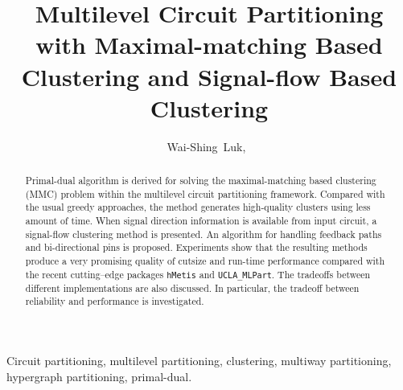 \documentclass[journal]{IEEEtran}
\begin{document}
\title{
  Multilevel Circuit Partitioning with Maximal-matching Based
  Clustering and Signal-flow Based Clustering
} 
\author{Wai-Shing~Luk,~}%
\maketitle

\begin{abstract}
Primal-dual algorithm is derived for solving
the maximal-matching based clustering (MMC) problem within the multilevel
circuit partitioning framework. Compared with the usual greedy approaches, the
method generates high-quality clusters using less amount of time. 
When signal direction information is available from input
circuit, a signal-flow clustering method is presented. An algorithm for
handling feedback paths and bi-directional pins is proposed.
Experiments show that the resulting methods produce a
very promising quality of cutsize and run-time performance compared
with the recent cutting--edge packages \verb+hMetis+ and \verb+UCLA_MLPart+. 
The tradeoffs between different implementations are also discussed.   
In particular, the tradeoff between reliability and performance is
investigated.
\end{abstract}

\begin{keywords}
Circuit partitioning, multilevel partitioning, clustering, 
multiway partitioning, hypergraph partitioning, primal-dual.
\end{keywords}

\IEEEpeerreviewmaketitle
\end{document}
